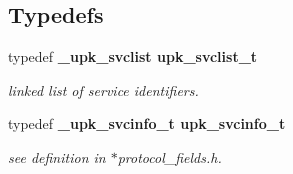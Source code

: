 \subsection*{Typedefs}
\begin{CompactItemize}
\item 
typedef \bf{\_\-upk\_\-svclist} \bf{upk\_\-svclist\_\-t}
\begin{CompactList}\small\item\em linked list of service identifiers. \item\end{CompactList}\item 
typedef \bf{\_\-upk\_\-svcinfo\_\-t} \bf{upk\_\-svcinfo\_\-t}
\begin{CompactList}\small\item\em see definition in $\ast$protocol\_\-fields.h. \item\end{CompactList}\end{CompactItemize}
